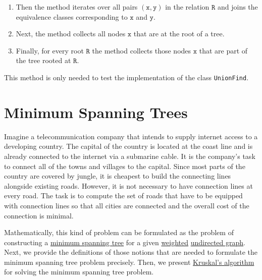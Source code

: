\begin{enumerate}
\begin{enumerate}
      \item Then the method iterates over all pairs $(\texttt{x},\texttt{y})$ in the relation $\texttt{R}$ and
            joins the equivalence classes corresponding to $\texttt{x}$ and $\texttt{y}$.
      \item Next, the method collects all nodes $\texttt{x}$ that are at the root of a tree.
      \item Finally, for every root $\texttt{R}$ the method collects those nodes $\texttt{x}$ that are
            part of the tree rooted at $\texttt{R}$.
      \end{enumerate}
      This method is only needed to test the implementation of the class \texttt{UnionFind}.
\end{enumerate}


\section{Minimum Spanning Trees}
Imagine a telecommunication company that intends to supply internet access to a developing country.
The capital of the country is located at the coast line and is already connected to the internet via
a submarine cable. It is the company's task to connect all of the towns and villages to the capital.
Since most parts of the country are covered by jungle, it is cheapest to build the connecting lines
alongside existing roads.  However, it is not necessary to have connection lines at every road.  The task is to
compute the set of roads that have to be equipped with connection lines so that all cities are connected and
the overall cost of the connection is minimal.

Mathematically, this kind of problem can be formulated as the problem of
constructing a \href{https://en.wikipedia.org/wiki/Minimum_spanning_tree}{minimum spanning tree} for
a given \href{https://en.wikipedia.org/wiki/Graph_(discrete_mathematics)#Weighted_graph}{weighted}
\href{https://en.wikipedia.org/wiki/Graph_(discrete_mathematics)#Undirected_graph}{undirected graph}.
Next, we provide the definitions of those notions that are needed to formulate the minimum spanning
tree problem precisely.  Then, we present
\href{https://en.wikipedia.org/wiki/Kruskal%27s_algorithm}{Kruskal's algorithm} for solving the
minimum spanning tree problem. 

